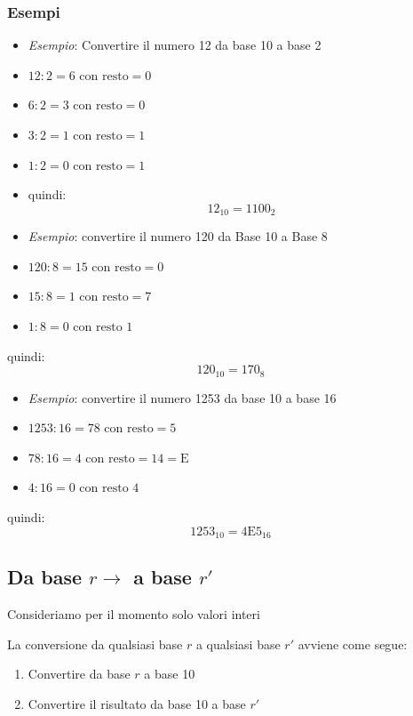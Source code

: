\subsubsection{Esempi}
\begin{itemize}
    \item \textit{Esempio}: Convertire il numero 12 da base 10 a base 2
    \item $12 : 2 = 6 \text{ con resto} = 0$
    \item $6 : 2 = 3 \text{ con resto} = 0$
    \item $3 : 2 = 1 \text{ con resto} = 1$
    \item $1 : 2 = 0 \text{ con resto} = 1$
    \item quindi:
    \[
        12_{10} = 1100_2
    \]
\end{itemize}

\begin{itemize}
    \item \textit{Esempio}: convertire il numero 120 da Base 10 a Base 8
    \item $120 : 8 = 15 \text{ con resto} = 0$
    \item $15 : 8 = 1 \text{ con resto} = 7$
    \item $1 : 8 = 0 \text{ con resto } 1$
\end{itemize}
quindi:
\[
    120_{10} = 170_8
\]

\begin{itemize}
    \item \textit{Esempio}: convertire il numero 1253 da base 10 a base 16
    \item $1253 : 16 = 78 \text{ con resto} = 5$
    \item $78 : 16 = 4 \text{ con resto} = 14 = \text{E}$
    \item $4 : 16 = 0 \text{ con resto } 4$
\end{itemize}
quindi:
\[
    1253_{10} = 4\text{E}5_{16}
\]

\subsection{Da base $r \rightarrow$ a base $r'$}
Consideriamo per il momento solo valori interi

La conversione da qualsiasi base $r$ a qualsiasi base $r'$ avviene come segue:
\begin{enumerate}
    \item Convertire da base $r$ a base 10
    \item Convertire il risultato da base 10 a base $r'$
\end{enumerate}

